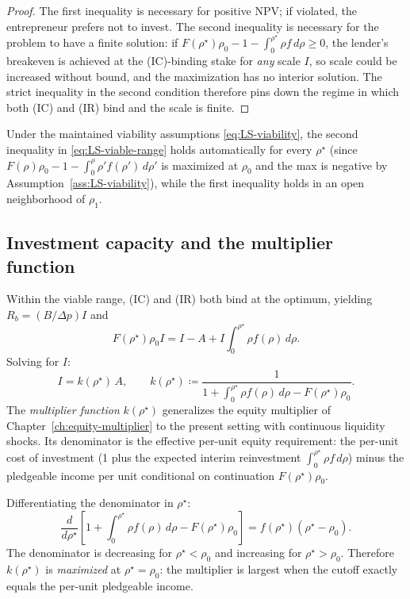 \documentclass[11pt,a4paper,oneside]{book}
\def\geq{\geqslant}
\theoremstyle{plain}
\theoremstyle{definition}
\theoremstyle{remark}
\numberwithin{equation}{chapter}
\begin{document}
\begin{proof}
The first inequality is necessary for positive NPV; if violated, the entrepreneur prefers not to invest.
The second inequality is necessary for the problem to have a finite solution: if $F(\rho^\star)\rho_0 - 1 - \int_0^{\rho^\star}\rho f \, d\rho \geq 0$, the lender's breakeven is achieved at the (IC)-binding stake for \emph{any} scale $I$, so scale could be increased without bound, and the maximization has no interior solution.
The strict inequality in the second condition therefore pins down the regime in which both (IC) and (IR) bind and the scale is finite.
\end{proof}

Under the maintained viability assumptions \eqref{eq:LS-viability}, the second inequality in \eqref{eq:LS-viable-range} holds automatically for every $\rho^\star$ (since $F(\rho)\rho_0 - 1 - \int_0^\rho \rho'f(\rho') \, d\rho'$ is maximized at $\rho_0$ and the max is negative by Assumption~\ref{ass:LS-viability}), while the first inequality holds in an open neighborhood of $\rho_1$.

\subsection{Investment capacity and the multiplier function}

Within the viable range, (IC) and (IR) both bind at the optimum, yielding $R_b = (B/\Delta p) I$ and
\begin{equation*}
  F(\rho^\star) \rho_0 I = I - A + I \int_0^{\rho^\star} \rho f(\rho) \, d\rho.
\end{equation*}
Solving for $I$:
\begin{equation}\label{eq:LS-I-multiplier}
  I = k(\rho^\star) \, A,
  \qquad
  k(\rho^\star) \coloneqq \frac{1}{1 + \int_0^{\rho^\star} \rho f(\rho) \, d\rho - F(\rho^\star) \rho_0}.
\end{equation}
The \emph{multiplier function} $k(\rho^\star)$ generalizes the equity multiplier of Chapter~\ref{ch:equity-multiplier} to the present setting with continuous liquidity shocks.
Its denominator is the effective per-unit equity requirement: the per-unit cost of investment (1 plus the expected interim reinvestment $\int_0^{\rho^\star}\rho f \, d\rho$) minus the pledgeable income per unit conditional on continuation $F(\rho^\star)\rho_0$.

Differentiating the denominator in $\rho^\star$:
\begin{equation*}
  \frac{d}{d\rho^\star} \left[ 1 + \int_0^{\rho^\star} \rho f(\rho) \, d\rho - F(\rho^\star) \rho_0 \right] = f(\rho^\star)(\rho^\star - \rho_0).
\end{equation*}
The denominator is decreasing for $\rho^\star < \rho_0$ and increasing for $\rho^\star > \rho_0$.
Therefore $k(\rho^\star)$ is \emph{maximized} at $\rho^\star = \rho_0$: the multiplier is largest when the cutoff exactly equals the per-unit pledgeable income.
\end{document}
